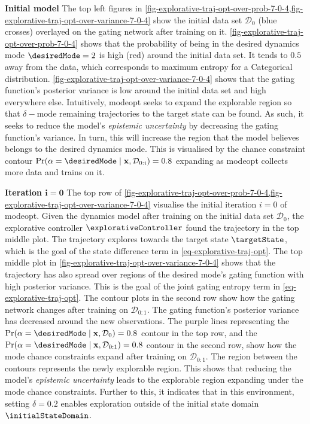\documentclass{mimosis-class/mimosis}
\numberwithin{equation}{chapter}
\newcommand{\state}{\ensuremath{\mathbf{x}}}
\newcommand{\dataset}{\ensuremath{\mathcal{D}}}
\newcommand{\modeVar}{\ensuremath{\alpha}}
\begin{document}
{\textbf{Initial model}
The top left figures in
\cref{fig-explorative-traj-opt-over-prob-7-0-4,fig-explorative-traj-opt-over-variance-7-0-4}
show the initial data set \(\dataset_0\) (blue crosses) overlayed on the gating network after training on it.
\cref{fig-explorative-traj-opt-over-prob-7-0-4}
 shows that the probability of being in the desired dynamics mode \(\desiredMode=2\) is high (red)
around the initial data set.
It tends to \(0.5\) away from the data, which corresponds to maximum entropy for a Categorical distribution.
\cref{fig-explorative-traj-opt-over-variance-7-0-4}
shows that the gating function's posterior variance is low around the initial data set and high everywhere else.
Intuitively, \acrshort{modeopt} seeks to expand the explorable region so that
\(\delta-\text{mode remaining}\) trajectories to the target state can be found.
As such, it seeks to reduce the model's \emph{epistemic uncertainty} by decreasing the gating function's variance.
In turn, this will increase the region that the model believes belongs to the desired dynamics mode.
This is visualised by the chance constraint contour \(\Pr(\modeVar=\desiredMode \mid \state, \dataset_{0:i})=0.8\)
expanding as \acrshort{modeopt} collects more data and trains on it.

\textbf{Iteration \(\mathbf{i=0}\)}
The top row of
\cref{fig-explorative-traj-opt-over-prob-7-0-4,fig-explorative-traj-opt-over-variance-7-0-4}
visualise the initial iteration \(i=0\) of \acrshort{modeopt}.
Given the dynamics model after training on the initial data set \(\dataset_0\),
the explorative controller \(\explorativeController\) found the trajectory in the top middle plot.
The trajectory explores towards the target state \(\targetState\), which
is the goal of the state difference term in \cref{eq-explorative-traj-opt}.
The top middle plot in \cref{fig-explorative-traj-opt-over-variance-7-0-4}
shows that the trajectory has also spread over regions of the desired
mode's gating function with high posterior variance.
This is the goal of the joint gating entropy term in \cref{eq-explorative-traj-opt}.
The contour plots in the second row
show how the gating network changes after training on \(\dataset_{0:1}\).
The gating function's posterior variance has decreased around the new observations.
The purple lines representing the
\(\Pr(\alpha=\desiredMode \mid \state, \dataset_{0}) = 0.8\) contour in the top row,
and the \(\Pr(\alpha=\desiredMode \mid \state, \dataset_{0:1}) = 0.8\) contour in the second row,
show how the mode chance constraints expand after training on \(\dataset_{0:1}\).
The region between the contours represents the newly explorable region.
This shows that reducing the model's \emph{epistemic uncertainty} leads to the explorable region expanding under the
mode chance constraints.
Further to this, it indicates that in this environment, setting \(\delta=0.2\) enables exploration outside of the initial
state domain \(\initialStateDomain\).

}
\end{document}
